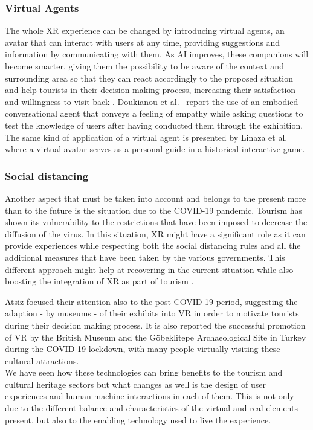 \subsubsection{Virtual Agents}
The whole XR experience can be changed by introducing virtual agents, an avatar that can interact with users at any time, providing suggestions and information by communicating with them. As AI improves, these companions will become smarter, giving them the possibility to be aware of the context and surrounding area so that they can react accordingly to the proposed situation \cite{norouzi_systematic_2020} and help tourists in their decision-making process, increasing their satisfaction and willingness to visit back \cite{loureiro_20_2020}.
Doukianou et al.~\cite{doukianou_beyond_2020} report the use of an embodied conversational agent that conveys a feeling of empathy while asking questions to test the knowledge of users after having conducted them through the exhibition. The same kind of application of a virtual agent is presented by Linaza et al.~\cite{linaza_interactive_2007} where a virtual avatar serves as a personal guide in a historical interactive game.

\subsubsection{Social distancing}
Another aspect that must be taken into account and belongs to the present more than to the future is the situation due to the COVID-19 pandemic. Tourism has shown its vulnerability to the restrictions that have been imposed to decrease the diffusion of the virus. In this situation, XR might have a significant role as it can provide experiences while respecting both the social distancing rules and all the additional measures that have been taken by the various governments. This different approach might help at recovering in the current situation while also boosting the integration of XR as part of tourism \cite{kwok_covid-19_2020}.

Atsiz \cite{atsiz_virtual_2021} focused their attention also to the post COVID-19 period, suggesting the adaption - by museums - of their exhibits into VR in order to motivate tourists during their decision making process. It is also reported the successful promotion of VR by the British Museum and the Göbeklitepe Archaeological Site in Turkey during the COVID-19 lockdown, with many people virtually visiting these cultural attractions.
\\

We have seen how these technologies can bring benefits to the tourism and cultural heritage sectors but what changes as well is the design of user experiences and human-machine interactions in each of them. This is not only due to the different balance and characteristics of the virtual and real elements present, but also to the enabling technology used to live the experience.